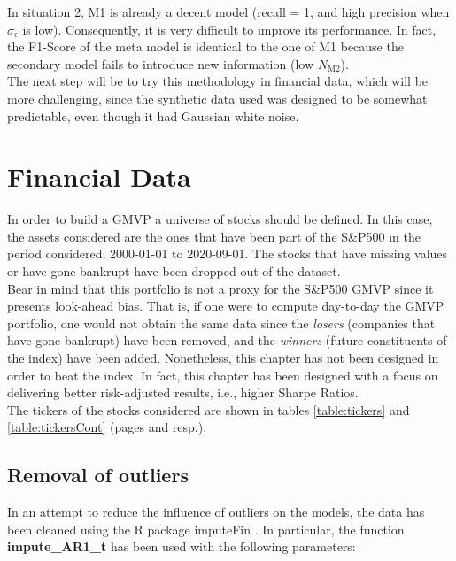 \documentclass[a4paper]{report}
\begin{document}
In situation 2, M1 is already a decent model (recall = 1, and high 
precision when $\sigma_\epsilon$ is low). Consequently, it is very 
difficult to improve its performance. In fact, the F1-Score of the 
meta model is identical to the one of M1 because the secondary model 
fails to introduce new information (low $N_{\text{M2}}$).\\

The next step will be to try this methodology in financial data, which 
will be more challenging, since the synthetic data used was designed to be 
somewhat predictable, even though it had Gaussian white noise.

\section{Financial Data}
In order to build a GMVP a universe of stocks should be defined. In this 
case, the assets considered are the ones that have been part of the S\&P500 
in the period considered; 2000-01-01 to 2020-09-01. The stocks that have 
missing values or have gone bankrupt have been dropped out of the dataset.\\

Bear in mind that this portfolio is not a proxy for the S\&P500 GMVP since 
it presents look-ahead bias. That is, if one were to compute day-to-day the 
GMVP portfolio, one would not obtain the same data since the \textit{losers} 
(companies that have gone bankrupt) have been removed, and the 
\textit{winners} (future constituents of the index) have been added. 
Nonetheless, this chapter has not been designed in order to beat the index. 
In fact, this chapter has been designed with a focus on delivering better 
risk-adjusted results, i.e., higher Sharpe Ratios.\\

The tickers of the stocks considered are shown in tables 
\ref{table:tickers} and \ref{table:tickersCont} (pages
\pageref{table:tickers} and \pageref{table:tickersCont} resp.).

\subsection{Removal of outliers}
\label{sec:removalOutliers}
In an attempt to reduce the influence of outliers on the models, the 
data has been cleaned using the R package imputeFin \cite{imputeFin}.
 In particular, the function \textbf{impute\_AR1\_t} has been used 
 with the following parameters:
\end{document}
